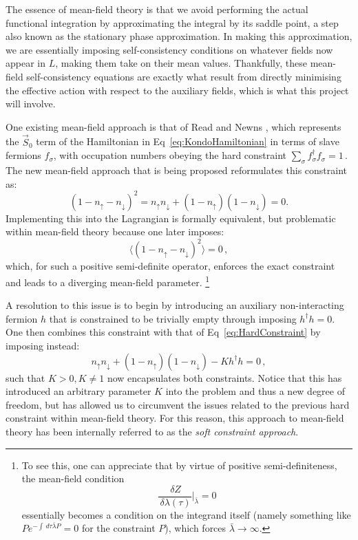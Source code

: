 \documentclass[12pt]{article}
\begin{document}
The essence of mean-field theory is that we avoid performing the actual functional integration by approximating the integral by its saddle point, a step also known as the stationary phase approximation. In making this approximation, we are essentially imposing self-consistency conditions on whatever fields now appear in $ L $, making them take on their mean values. Thankfully, these mean-field self-consistency equations are exactly what result from directly minimising the effective action with respect to the auxiliary fields, which is what this project will involve.

One existing mean-field approach is that of Read and Newns \cite{ReadNewns}, which represents the $ \vec{S}_0 $ term of the Hamiltonian in Eq~\eqref{eq:KondoHamiltonian} in terms of slave fermions $ f^{}_{\sigma} $, with occupation numbers obeying the hard constraint $ \sum_{\sigma} f^{\dagger}_{\sigma} f^{}_{\sigma} = 1 \,. $ The new mean-field approach that is being proposed reformulates this constraint as: \begin{equation} (1 - n_{\uparrow} - n_{\downarrow})^2 = n_{\uparrow} n_{\downarrow} + (1 - n_{\uparrow})(1 - n_{\downarrow}) = 0 . \label{eq:HardConstraint}\end{equation} Implementing this into the Lagrangian is formally equivalent, but problematic within mean-field theory because one later imposes: \[ \langle (1 - n_{\uparrow} - n_{\downarrow})^2 \rangle = 0\,, \] which, for such a positive semi-definite operator, enforces the exact constraint and leads to a diverging mean-field parameter. \footnote{To see this, one can appreciate that by virtue of positive semi-definiteness, the mean-field condition \[ \frac{\, \delta Z}{\, \delta \lambda(\tau)} \Bigr|_{\bar{\lambda}} = 0 \] essentially becomes a condition on the integrand itself (namely something like $ P e^{- \int \, d\tau \bar{\lambda} P} = 0 $ for the constraint $ P $), which forces $ \bar{\lambda} \rightarrow \infty $.}

A resolution to this issue is to begin by introducing an auxiliary non-interacting fermion $ h $ that is constrained to be trivially empty through imposing $ h^{\dagger} h = 0 $. One then combines this constraint with that of Eq~\eqref{eq:HardConstraint} by imposing instead: \begin{equation} n_{\uparrow} n_{\downarrow} + (1 - n_{\uparrow})(1 - n_{\downarrow}) - K h^{\dagger} h = 0\,, \end{equation} such that $ K > 0, K \neq 1 $ now encapsulates both constraints. Notice that this has introduced an arbitrary parameter $ K $ into the problem and thus a new degree of freedom, but has allowed us to circumvent the issues related to the previous hard constraint within mean-field theory. For this reason, this approach to mean-field theory has been internally referred to as the \emph{soft constraint approach}.
\end{document}
